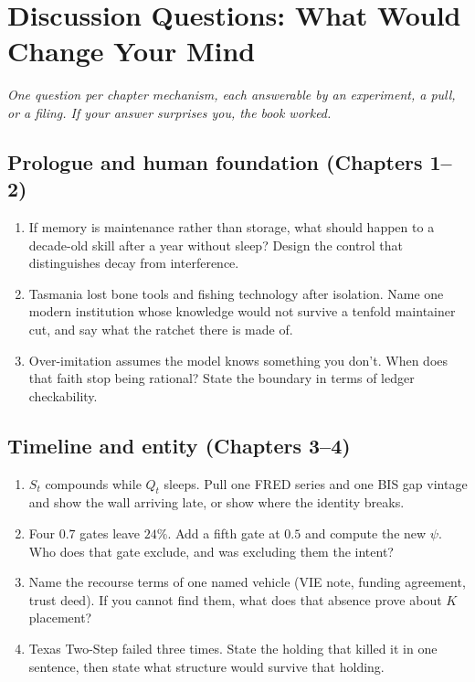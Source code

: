 \chapter{Discussion Questions: What Would Change Your Mind}

\textit{One question per chapter mechanism, each answerable by an experiment, a pull, or a filing. If your answer surprises you, the book worked.}

\section*{Prologue and human foundation (Chapters 1--2)}

\begin{enumerate}
\item If memory is maintenance rather than storage, what should happen to a decade-old skill after a year without sleep? Design the control that distinguishes decay from interference.
\item Tasmania lost bone tools and fishing technology after isolation. Name one modern institution whose knowledge would not survive a tenfold maintainer cut, and say what the ratchet there is made of.
\item Over-imitation assumes the model knows something you don't. When does that faith stop being rational? State the boundary in terms of ledger checkability.
\end{enumerate}

\section*{Timeline and entity (Chapters 3--4)}

\begin{enumerate}
\item $S_t$ compounds while $Q_t$ sleeps. Pull one FRED series and one BIS gap vintage and show the wall arriving late, or show where the identity breaks.
\item Four $0.7$ gates leave $24\%$. Add a fifth gate at $0.5$ and compute the new $\psi$. Who does that gate exclude, and was excluding them the intent?
\item Name the recourse terms of one named vehicle (VIE note, funding agreement, trust deed). If you cannot find them, what does that absence prove about $K$ placement?
\item Texas Two-Step failed three times. State the holding that killed it in one sentence, then state what structure would survive that holding.
\end{enumerate}

